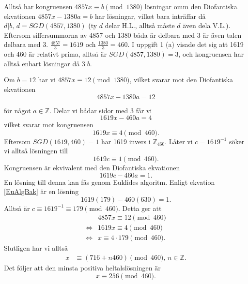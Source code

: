 \documentclass{article}
\begin{document}
\begin{enumerate}[label=(\alph*)]
	Alltså har kongruensen $4857x \equiv b \pmod{1380}$ lösningar omm den Diofantiska ekvationen $4857x - 1380a = b$ har lösningar, vilket bara inträffar då $d \vert b, \, d = SGD(4857, 1380)$ (ty $d$ delar H.L., alltså måste $d$ även dela V.L.). Eftersom siffersummorna av 4857 och 1380 båda är delbara med 3 är även talen delbara med 3. $\frac{4857}{3} = 1619$ och $\frac{1380}{3} = 460$. I uppgift 1 (a) visade det sig att 1619 och 460 är relativt prima, alltså är $SGD(4857, 1380) = 3$, och kongruensen har alltså enbart lösningar då $3 \vert b$.

	Om $b = 12$ har vi $4857x \equiv 12 \pmod{1380}$, vilket svarar mot den Diofantiska ekvationen
	\[
		4857x - 1380a = 12
	\] 

	för något $a \in \mathbb{Z}$. Delar vi bådar sidor med 3 får vi
	\[
		1619x - 460a = 4
	\] 
	vilket svarar mot kongruensen
	\[
		1619x \equiv 4 \pmod{460}
	.\] 
	Eftersom $SGD(1619, 460) = 1$ har 1619 invers i $\mathbb{Z}_{460}$. Låter vi $c = 1619^{-1}$ söker vi alltså lösningen till
	 \[
		 1619c \equiv 1 \pmod{460}
	.\] 
	Kongruensen är ekvivalent med den Diofantiska ekvationen
	\[
		1619c - 460a = 1
	.\] 
	En lösning till denna kan fås genom Euklides algoritm. Enligt ekvation \ref{EuAlgBak} är en lösning
	\[
		1619(179) - 460(630) = 1
	.\] 
	Alltså är $c \equiv 1619^{-1} \equiv 179 \pmod{460}$. Detta ger att
	\begin{equation*}
			\begin{aligned}
				&4857x \equiv 12 \pmod{460}\\
				\iff &1619x \equiv 4 \pmod{460}\\
				\iff &x \equiv 4 \cdot 179 \pmod{460}.
			\end{aligned}
		\end{equation*}
		Slutligen har vi alltså
		\begin{equation*}
			\begin{aligned}
				x &\equiv \left( 716 + n 460 \right)  \pmod{460}, \, n \in \mathbb{Z}.
			\end{aligned}
		\end{equation*}
		Det följer att den minsta positiva heltalslösningen är
		\[
			x \equiv 256 \pmod{460}
		.\] 


\end{enumerate}
\end{document}
